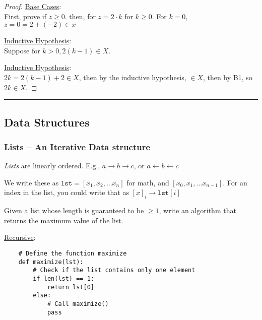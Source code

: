 \documentclass{article}
\def \proofDistance {5pt}
\newcommand{\proofseparator}{\par\noindent\rule{\textwidth}{0.4pt}}
\newcommand{\pf}[1]{
    \vspace{\proofDistance}
    \begin{proof}
    #1
    \end{proof}
    \proofseparator
}
\begin{document}
        \pf{
            \item \underline{Base Cases}: \\
            First, prove if $z \geq 0$. then, for $z = 2\cdot k$ for $k \geq 0$. For $k = 0$, $z = 0 = 2 + (-2) \in x$ \\

            \item \underline{Inductive Hypothesis}: \\
            Suppose for $k > 0, 2(k-1) \in X$. \\

            \item \underline{Inductive Hypothesis}: \\
            $2k = 2(k - 1) + 2 \in X$, then by the inductive hypothesis, $\in X$, then by B1, so $2k \in X$.
        }

\newpage

    \subsection{Data Structures}
        \subsubsection{Lists -- An Iterative Data structure}

            \begin{definition}
                \textit{Lists} are linearly ordered. E.g., $a \rightarrow b \rightarrow c$, or $a \leftarrow b \leftarrow c$
            \end{definition}

            \begin{terminology}
                We write these as $\texttt{lst} = [x_1,x_2,\dots x_n]$ for math, and $[x_0,x_1,\dots x_{n-1}]$. For an index in the list, you could write that as $[x]_i \rightarrow \texttt{lst}[i]$
            \end{terminology}

            \vspace{0.5cm}

            \begin{example}
                Given a list whose length is guaranteed to be $\geq 1$, write an algorithm that returns the maximum value of the list. 
            \end{example}

            \underline{Recursive}:
            \begin{lstlisting}
    # Define the function maximize
    def maximize(lst):
        # Check if the list contains only one element
        if len(lst) == 1:
            return lst[0]
        else:
            # Call maximize()
            pass
            \end{lstlisting}
\end{document}
